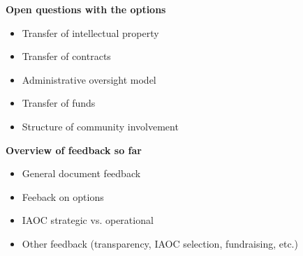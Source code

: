 \documentclass[helvetica]{seminar}
\newcommand{\heading}[1]{%
  \begin{center} 
    \large\bf 
    #1 
  \end{center} 
  \vspace{.4 in}}
\begin{document}
\begin{slide}

\heading{Open questions with the options}

\begin{itemize}
\item Transfer of intellectual property
\item Transfer of contracts
\item Administrative oversight model
\item Transfer of funds
\item Structure of community involvement
\end{itemize}

\end{slide}

\begin{slide}

\heading{Overview of feedback so far}

\begin{itemize}
\item General document feedback
\item Feeback on options
\item IAOC strategic vs. operational
\item Other feedback (transparency, IAOC selection, fundraising, etc.)
\end{itemize}

\end{slide}
\end{document}

